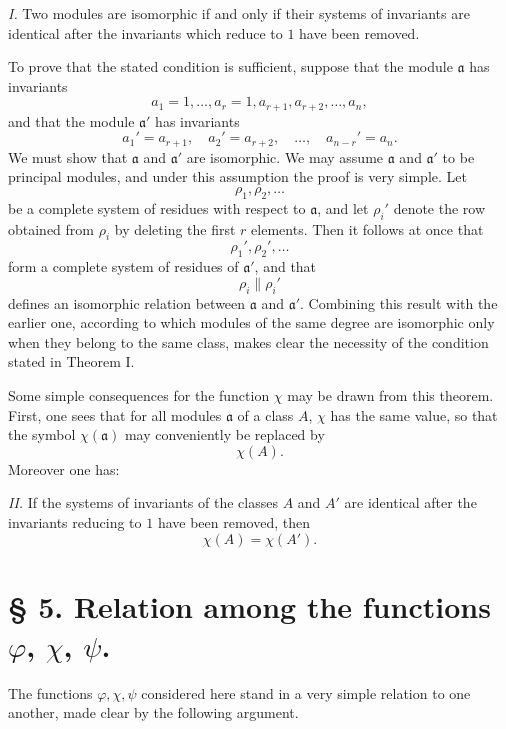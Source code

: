 \emph{I.} Two modules are isomorphic if and only if their systems of invariants are identical after the invariants which reduce to $1$ have been removed.

To prove that the stated condition is sufficient, suppose that the module $\mathfrak a$ has invariants
\[
 a_1=1,\ldots,a_r=1,a_{r+1},a_{r+2},\ldots,a_n,
\]
and that the module $\mathfrak a'$ has invariants
\[
 a_1'=a_{r+1},\quad a_2'=a_{r+2},\quad\ldots,\quad a_{n-r}'=a_n.
\]
We must show that $\mathfrak a$ and $\mathfrak a'$ are isomorphic. We may assume $\mathfrak a$ and $\mathfrak a'$ to be principal modules, and under this assumption the proof is very simple. Let
\[
 \rho_1,\rho_2,\ldots
\]
be a complete system of residues with respect to $\mathfrak a$, and let $\rho_i'$ denote the row obtained from $\rho_i$ by deleting the first $r$ elements. Then it follows at once that
\[
 \rho_1',\rho_2',\ldots
\]
form a complete system of residues of $\mathfrak a'$, and that
\[
 \rho_i\parallel\rho_i'
\]
defines an isomorphic relation between $\mathfrak a$ and $\mathfrak a'$. Combining this result with the earlier one, according to which modules of the same degree are isomorphic only when they belong to the same class, makes clear the necessity of the condition stated in Theorem I.

Some simple consequences for the function $\chi$ may be drawn from this theorem. First, one sees that for all modules $\mathfrak a$ of a class $A$, $\chi$ has the same value, so that the symbol $\chi(\mathfrak a)$ may conveniently be replaced by
\[
 \chi(A).
\]
Moreover one has:

\emph{II.} If the systems of invariants of the classes $A$ and $A'$ are identical after the invariants reducing to $1$ have been removed, then
\[
 \chi(A)=\chi(A').
\]

\section*{§ 5. Relation among the functions $\varphi$, $\chi$, $\psi$.}

The functions $\varphi,\chi,\psi$ considered here stand in a very simple relation to one another, made clear by the following argument.

